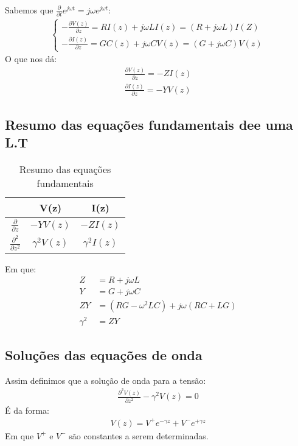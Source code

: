 \documentclass[11pt,a4paper]{article}
\begin{document}
Sabemos que $ \frac{\partial }{\partial t} e^{j \omega t}= j \omega e^{j \omega t}$:
\begin{align*}
  \begin{cases}
   -\frac{\partial V(z)}{\partial z}  = RI (z) + j \omega LI (z) = (R + j \omega L) I(Z) \\
   - \frac{\partial I(z)}{\partial z} = GC (z) + j \omega CV (z) = (G + j \omega C) V(z)
  \end{cases}
\end{align*}
O que nos dá:
\begin{align*}
  \frac{\partial V(z)}{\partial z} = - ZI(z) \\
  \frac{\partial I(z)}{\partial z} = -YV(z)
\end{align*}
\subsection{Resumo das equações fundamentais dee uma L.T}
\begin{table}[htpb]
  \centering
  \label{tab:1}
  \begin{tabular}{c c c}
    \toprule
    &  V(z)& I(z)  \\ \midrule
       $\frac{\partial}{\partial z}$ & $-YV(z)$ & $-ZI(z)$\\ \midrule
       $\frac{\partial^2 }{\partial z^2 }$ & $\gamma^2 V(z)$ & $\gamma^2 I(z)$ \\ \bottomrule
  \end{tabular}
  \caption{Resumo das equações fundamentais}
\end{table}

Em que:
  \begin{align*}
  Z &= R + j \omega L \\
  Y &= G + j \omega C \\
  ZY &= (RG- \omega^2 LC) + j \omega (RC+LG) \\
  \gamma^2 &= ZY
  \end{align*}
  \subsection{Soluções das equações de onda}
  Assim definimos que a solução de onda para a tensão:
  \begin{align*}
    \frac{\partial^2 V(z)}{\partial z^2} - \gamma^2 V(z) =0 
  \end{align*} 
  É da forma:
  \begin{align*}
  V(z)= V^+ e^{- \gamma z} + V^- e^{+\gamma z}
  \end{align*}
  Em que $V^+$ e $V^-$ são constantes a serem determinadas.
  
\end{document}

